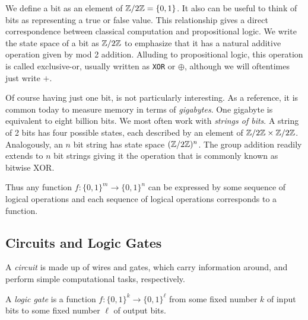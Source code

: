 
        We define a bit as an element of $\mathbb{Z}/2\mathbb{Z} = \{0,1\}$. It also can be useful to think of bits as representing 
        a true or false value. This relationship gives a direct correspondence between classical computation and 
        propositional logic. We write the state space of a bit as $\mathbb{Z}/2\mathbb{Z}$ to emphasize that it has a natural 
        additive operation given by mod 2 addition.  Alluding to propositional logic, this operation is called 
        exclusive-or, usually written as \texttt{XOR} or $\oplus$, although we will oftentimes just write $+$.

        Of course having just one bit, is not particularly interesting. As a reference, it is common today to 
        measure memory in terms of \emph{gigabytes}. One gigabyte is equivalent to eight billion bits. We most 
        often work with \emph{strings of bits}. A string of 2 bits has four possible states, each described by an 
        element of $\mathbb{Z}/2\mathbb{Z} \times \mathbb{Z}/2\mathbb{Z}$. Analogously, an $n$ bit string has state space $(\mathbb{Z}/2\mathbb{Z})^n$. The group 
        addition readily extends to $n$ bit strings giving it the operation that is commonly known as bitwise XOR.


        Thus any function $f :  \{0, 1\}^m \rightarrow \{0, 1\}^n$ can be expressed by some sequence of logical 
        operations and each sequence of logical operations corresponds to a function. 
        
        \subsection{Circuits and Logic Gates}

        \begin{definition}
            A \emph{circuit} is made up of wires and gates, which carry information around, and perform simple 
            computational tasks, respectively.
        \end{definition}

        \begin{definition}
            A \emph{logic gate} is a function $f : \{0, 1\}^k \rightarrow \{0, 1\}^\ell$ from some fixed number $k$ 
            of input bits to some fixed number $\ell$ of output bits.
        \end{definition}

